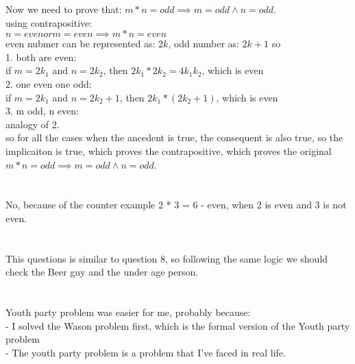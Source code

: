 \documentclass{article}
\begin{document}
Now we need to prove that:
$m * n = odd \implies m = odd \wedge n = odd$. \\
using contrapositive: \\
$n = even or m = even \implies m*n = even$ \\
even nubmer can be represented as: $2k$, odd number as: $2k +1$ so \\
1. both are even: \\
if $m = 2k_1$ and $n = 2k_2$, then $2k_1*2k_2 = 4k_1k_2$, which is even\\
2. one even one odd: \\
if $m = 2k_1$ and $n = 2k_2 + 1$, then $2k_1*(2k_2 + 1)$, which is even\\
3. m odd, n even: \\
analogy of 2. \\
so for all the cases when the ancedent is true, the consequent is also true, so the implicaiton is true, which proves the contrapositive, which proves the original $m * n = odd \implies m = odd \wedge n = odd$. \\

\section{}
No, because of the counter example 2 * 3 = 6 - even, when 2 is even and 3 is not even.

\section{}
This questions is similar to question 8, so following the same logic we should check the Beer guy and the under age person.

\section{}
Youth party problem was easier for me, probably because: \\
- I solved the Wason problem first, which is the formal version of the Youth party problem \\
- The youth party problem is a problem that I've faced in real life. \\
\end{document}
